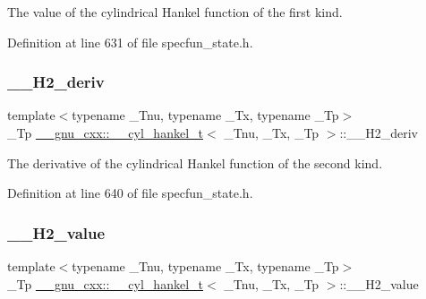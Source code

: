 The value of the cylindrical Hankel function of the first kind. 



Definition at line 631 of file specfun\+\_\+state.\+h.

\mbox{\label{struct____gnu__cxx_1_1____cyl__hankel__t_aac63a9d78d5e3ee6520073963da4cbbb}} 
\subsubsection{\texorpdfstring{\+\_\+\+\_\+\+H2\+\_\+deriv}{\_\_H2\_deriv}}
{\footnotesize\ttfamily template$<$typename \+\_\+\+Tnu, typename \+\_\+\+Tx, typename \+\_\+\+Tp$>$ \\
\+\_\+\+Tp \hyperlink{struct____gnu__cxx_1_1____cyl__hankel__t}{\+\_\+\+\_\+gnu\+\_\+cxx\+::\+\_\+\+\_\+cyl\+\_\+hankel\+\_\+t}$<$ \+\_\+\+Tnu, \+\_\+\+Tx, \+\_\+\+Tp $>$\+::\+\_\+\+\_\+\+H2\+\_\+deriv}



The derivative of the cylindrical Hankel function of the second kind. 



Definition at line 640 of file specfun\+\_\+state.\+h.

\mbox{\label{struct____gnu__cxx_1_1____cyl__hankel__t_a968496d4d370d39f2034657f32860faa}} 
\subsubsection{\texorpdfstring{\+\_\+\+\_\+\+H2\+\_\+value}{\_\_H2\_value}}
{\footnotesize\ttfamily template$<$typename \+\_\+\+Tnu, typename \+\_\+\+Tx, typename \+\_\+\+Tp$>$ \\
\+\_\+\+Tp \hyperlink{struct____gnu__cxx_1_1____cyl__hankel__t}{\+\_\+\+\_\+gnu\+\_\+cxx\+::\+\_\+\+\_\+cyl\+\_\+hankel\+\_\+t}$<$ \+\_\+\+Tnu, \+\_\+\+Tx, \+\_\+\+Tp $>$\+::\+\_\+\+\_\+\+H2\+\_\+value}



